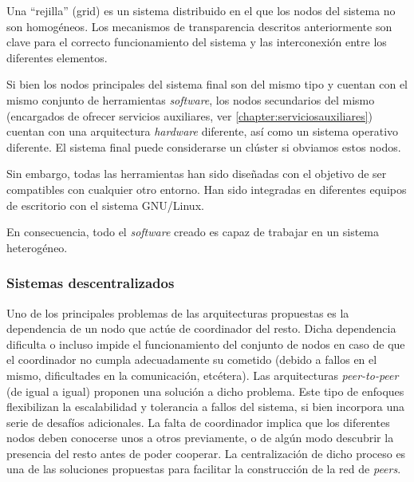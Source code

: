 Una ``rejilla'' (grid) es un sistema distribuido en el que los nodos del sistema no son homogéneos. Los mecanismos de transparencia descritos anteriormente son clave para el correcto funcionamiento del sistema y las interconexión entre los diferentes elementos.


Si bien los nodos principales del sistema final son del mismo tipo y cuentan con el mismo conjunto de herramientas \textit{software}, los nodos secundarios del mismo (encargados de ofrecer servicios auxiliares, ver \ref{chapter:serviciosauxiliares}) cuentan con una arquitectura \textit{hardware} diferente, así como un sistema operativo diferente. El sistema final puede considerarse un clúster si obviamos estos nodos.

Sin embargo, todas las herramientas han sido diseñadas con el objetivo de ser compatibles con cualquier otro entorno. Han sido integradas en diferentes equipos de escritorio con el sistema GNU/Linux. %

En consecuencia, todo el \textit{software} creado es capaz de trabajar en un sistema heterogéneo.


\subsubsection{Sistemas descentralizados}

Uno de los principales problemas de las arquitecturas propuestas es la dependencia de un nodo que actúe de coordinador del resto. Dicha dependencia dificulta o incluso impide el funcionamiento del conjunto de nodos en caso de que el coordinador no cumpla adecuadamente su cometido (debido a fallos en el mismo, dificultades en la comunicación, etcétera). Las arquitecturas \textit{peer-to-peer} (de igual a igual) proponen una solución a dicho problema. Este tipo de enfoques flexibilizan la escalabilidad y tolerancia a fallos del sistema, si bien incorpora una serie de desafíos adicionales. La falta de coordinador implica que los diferentes nodos deben conocerse unos a otros previamente, o de algún modo descubrir la presencia del resto antes de poder cooperar. La centralización de dicho proceso es una de las soluciones propuestas para facilitar la construcción de la red de \textit{peers}.

